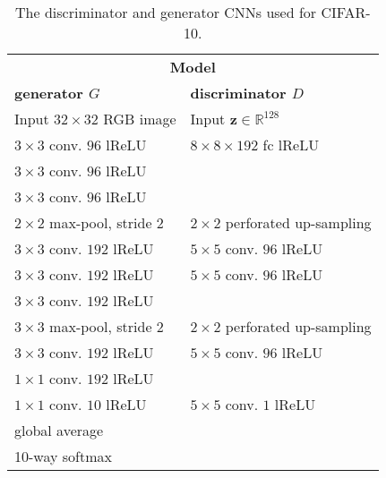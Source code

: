 \documentclass{article} \usepackage{iclr2016_conference,times}
\newcommand{\bz}{\mathbf{z}}
\begin{document}
\begin{appendix}
\begin{table}[h]
\caption{The discriminator and generator CNNs used for CIFAR-10.}
\label{base-models-cifar}
\begin{center}
\begin{small}
\begin{tabular}{l|l}
\multicolumn{2}{c}{\textbf{Model}} \\
\bf generator $G$        & \bf discriminator $D$  \\
\hline
Input $32 \times 32$ RGB image & Input $\bz \in \mathbb{R}^{128}$ \\
\hline
$3 \times 3$ conv. $96$ lReLU & $8 \times 8 \times 192$ fc lReLU  \\
$3 \times 3$ conv. $96$ lReLU &  \\
$3 \times 3$ conv. $96$ lReLU &  \\
\hline
$2 \times 2$ max-pool, stride $2$ & $2 \times 2$ perforated up-sampling \\
\hline
$3 \times 3$ conv. $192$ lReLU & $5 \times 5$ conv. $96$ lReLU \\
$3 \times 3$ conv. $192$ lReLU & $5 \times 5$ conv. $96$ lReLU \\
$3 \times 3$ conv. $192$ lReLU & \\
\hline
$3 \times 3$ max-pool, stride $2$ & $2 \times 2$ perforated
                                    up-sampling \\
\hline
$3 \times 3$ conv. $192$ lReLU & $5 \times 5$ conv. $96$ lReLU \\
$1 \times 1$ conv. $192$ lReLU & \\ 
$1 \times 1$ conv. $10$ lReLU & $5 \times 5$ conv. $1$ lReLU \\
global average & \\
10-way softmax & \\
\end{tabular}
\end{small}
\end{center}
\end{table}


\end{appendix}
\end{document}
